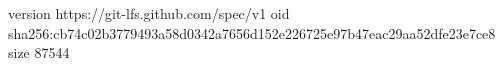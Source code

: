version https://git-lfs.github.com/spec/v1
oid sha256:cb74c02b3779493a58d0342a7656d152e226725e97b47eac29aa52dfe23e7ce8
size 87544

